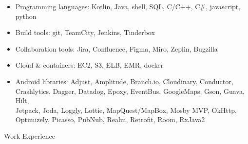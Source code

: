 \begin{itemize}
\item Programming languages: Kotlin, Java, shell, SQL, C/C++, C\#, javascript, python \\[-18pt]
\item Build tools: git, TeamCity, Jenkins, Tinderbox   \\[-18pt]
\item Collaboration tools: Jira, Confluence, Figma, Miro, Zeplin, Bugzilla    \\[-18pt]
\item Cloud \& containers: EC2, S3, ELB, EMR, docker  \\[-18pt]
\item Android libraries:
	Adjust, Amplitude, Branch.io, Cloudinary, Conductor,
	\\ Crashlytics, Dagger, Datadog, Epoxy, EventBus,
	GoogleMaps, Gson, Guava, Hilt, \\ Jetpack,
	Joda, Loggly, Lottie, MapQuest/MapBox, 
	Mosby MVP, OkHttp, \\ Optimizely, Picasso,
	PubNub, Realm, Retrofit, Room,
	RxJava2 \\
\end{itemize}


\begin{bf} \large
Work Experience
\end{bf}
\medskip

